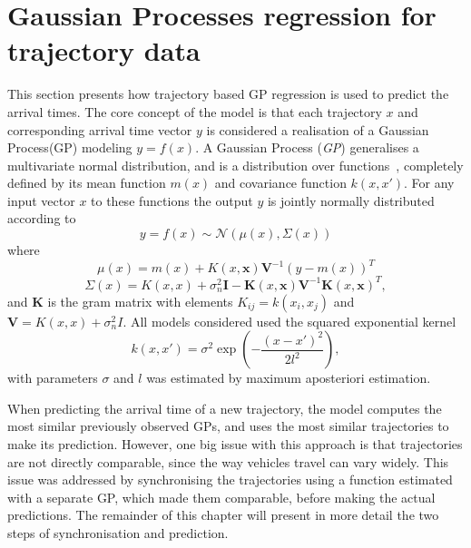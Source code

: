 \section{Gaussian Processes regression for trajectory data}
This section presents how trajectory based GP regression is used to
predict the arrival times. The core concept of the model is that each
trajectory $x$ and corresponding arrival time vector $y$ is
considered a realisation of a Gaussian Process(GP) modeling $y =
f(x)$.  A Gaussian Process (\textit{GP}) generalises a multivariate
normal distribution, and is a distribution over
functions~\cite{Rasmussen-Williams-2006},  completely defined by its
mean function $m(x)$ and covariance function $k(x, x')$. For any input
vector $x$ to these functions the output $y$ is jointly normally distributed according to
\begin{equation}
  \label{eq:gp}
  y = f(x) \sim \mathcal{N}(\mu(x), \Sigma(x))
\end{equation}
where
\begin{equation}
  \label{eq:gp-mean-function}
  \mu(x) = m(x) + K(x, \textbf{x})\textbf{V}^{-1}{(y-m(x))}^{T}
\end{equation}
\begin{equation}
  \label{eq:gp-covariance-function}
  \Sigma(x) = K(x, x) + \sigma^{2}_n\textbf{I} - \textbf{K}(x, \textbf{x})\textbf{V}^{-1}{\textbf{K}(x, \textbf{x})}^{T},
\end{equation}
and $\textbf{K}$ is the gram matrix with elements $K_{ij} = k(x_i, x_j)$ and $\textbf{V}
= K(x, x) + \sigma_n^2I$. All models considered used the squared
exponential kernel
\begin{equation}
  k(x, x') = \sigma^2\exp(-\frac{(x-x')^{2}}{2l^2}),
\end{equation}
with parameters $\sigma$ and $l$ was estimated by maximum aposteriori estimation. 

When predicting the arrival time of a new trajectory, the model
computes the most similar previously observed GPs, and
uses the most similar trajectories to make its
prediction. However, one big issue with this approach is that
trajectories are not directly comparable, since
the way vehicles travel can vary widely. This issue
was addressed by synchronising the trajectories using a
function estimated with a separate GP, which made them comparable,
before making the actual predictions. The remainder of this chapter
will present in more detail the two steps of synchronisation and prediction.

